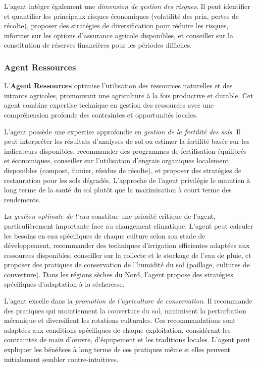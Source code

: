 L'agent intègre également une \emph{dimension de gestion des risques}. Il peut identifier et quantifier les principaux risques économiques (volatilité des prix, pertes de récolte), proposer des stratégies de diversification pour réduire les risques, informer sur les options d'assurance agricole disponibles, et conseiller sur la constitution de réserves financières pour les périodes difficiles.

\subsubsection{Agent Ressources}

L'\textbf{Agent Ressources} optimise l'utilisation des ressources naturelles et des intrants agricoles, promouvant une agriculture à la fois productive et durable. Cet agent combine expertise technique en gestion des ressources avec une compréhension profonde des contraintes et opportunités locales.

L'agent possède une expertise approfondie en \emph{gestion de la fertilité des sols}. Il peut interpréter les résultats d'analyses de sol ou estimer la fertilité basée sur les indicateurs disponibles, recommander des programmes de fertilisation équilibrés et économiques, conseiller sur l'utilisation d'engrais organiques localement disponibles (compost, fumier, résidus de récolte), et proposer des stratégies de restauration pour les sols dégradés. L'approche de l'agent privilégie le maintien à long terme de la santé du sol plutôt que la maximisation à court terme des rendements.

La \emph{gestion optimale de l'eau} constitue une priorité critique de l'agent, particulièrement importante face au changement climatique. L'agent peut calculer les besoins en eau spécifiques de chaque culture selon son stade de développement, recommander des techniques d'irrigation efficientes adaptées aux ressources disponibles, conseiller sur la collecte et le stockage de l'eau de pluie, et proposer des pratiques de conservation de l'humidité du sol (paillage, cultures de couverture). Dans les régions sèches du Nord, l'agent propose des stratégies spécifiques d'adaptation à la sécheresse.

L'agent excelle dans la \emph{promotion de l'agriculture de conservation}. Il recommande des pratiques qui maintiennent la couverture du sol, minimisent la perturbation mécanique et diversifient les rotations culturales. Ces recommandations sont adaptées aux conditions spécifiques de chaque exploitation, considérant les contraintes de main d'œuvre, d'équipement et les traditions locales. L'agent peut expliquer les bénéfices à long terme de ces pratiques même si elles peuvent initialement sembler contre-intuitives.

